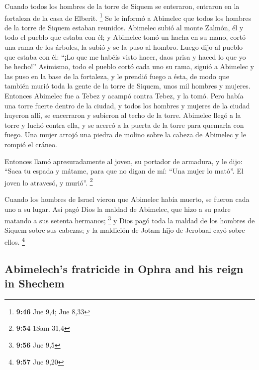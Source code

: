 \begin{paracol}{2}
 Cuando todos los hombres de la torre de Siquem se
enteraron, entraron en la fortaleza de la casa de Elberit. \footnote{\textbf{9:46}
  Jue 9,4; Jue 8,33}  Se le informó a Abimelec que todos
los hombres de la torre de Siquem estaban reunidos. 
Abimelec subió al monte Zalmón, él y todo el pueblo que estaba con él; y
Abimelec tomó un hacha en su mano, cortó una rama de los árboles, la
subió y se la puso al hombro. Luego dijo al pueblo que estaba con él:
``¡Lo que me habéis visto hacer, daos prisa y haced lo que yo he
hecho!''  Asimismo, todo el pueblo cortó cada uno su
rama, siguió a Abimelec y las puso en la base de la fortaleza, y le
prendió fuego a ésta, de modo que también murió toda la gente de la
torre de Siquem, unos mil hombres y mujeres.  Entonces
Abimelec fue a Tebez y acampó contra Tebez, y la tomó. 
Pero había una torre fuerte dentro de la ciudad, y todos los hombres y
mujeres de la ciudad huyeron allí, se encerraron y subieron al techo de
la torre.  Abimelec llegó a la torre y luchó contra ella,
y se acercó a la puerta de la torre para quemarla con fuego.
 Una mujer arrojó una piedra de molino sobre la cabeza de
Abimelec y le rompió el cráneo.

 Entonces llamó apresuradamente al joven, su portador de
armadura, y le dijo: ``Saca tu espada y mátame, para que no digan de mí:
``Una mujer lo mató''. El joven lo atravesó, y murió''. \footnote{\textbf{9:54}
  1Sam 31,4}

 Cuando los hombres de Israel vieron que Abimelec había
muerto, se fueron cada uno a su lugar.  Así pagó Dios la
maldad de Abimelec, que hizo a su padre matando a sus setenta hermanos;
\footnote{\textbf{9:56} Jue 9,5}  y Dios pagó toda la
maldad de los hombres de Siquem sobre sus cabezas; y la maldición de
Jotam hijo de Jerobaal cayó sobre ellos. \footnote{\textbf{9:57} Jue
  9,20}

\switchcolumn
\begin{otherlanguage}{english}

\hypertarget{abimelechs-fratricide-in-ophra-and-his-reign-in-shechem}{%
\subsection{Abimelech's fratricide in Ophra and his reign in
Shechem}\label{abimelechs-fratricide-in-ophra-and-his-reign-in-shechem}}


\end{otherlanguage}
\end{paracol}
